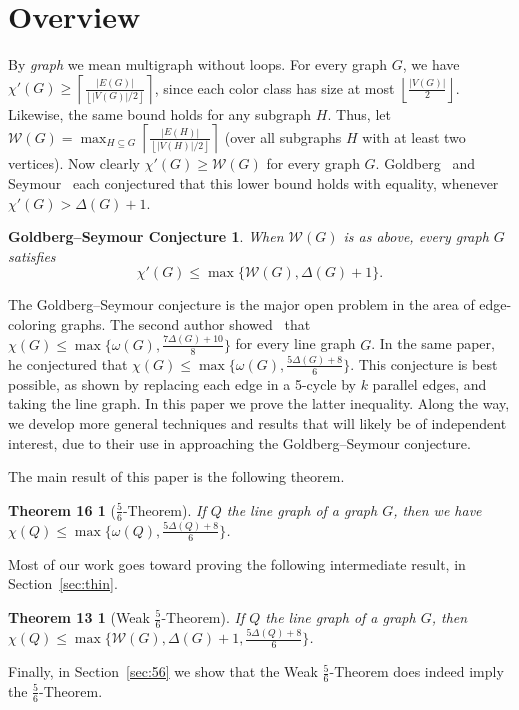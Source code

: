 \documentclass[12pt]{amsart}
\theoremstyle{plain}
\newtheorem*{GS}{Goldberg--Seymour Conjecture}
\newtheorem*{main}{Theorem 16}
\newtheorem*{main2}{Theorem 13}
\theoremstyle{definition}
\theoremstyle{remark}
\newcommand{\fancy}[1]{\mathcal{#1}}
\newcommand{\W}{\fancy{W}}
\newcommand{\ceil}[1]{\left\lceil#1\right\rceil}
\newcommand{\floor}[1]{\left\lfloor#1\right\rfloor}
\begin{document}
\section{Overview}

By \emph{graph} we mean multigraph without loops. For every graph $G$, we have $\chi'(G)\ge
\ceil{\frac{|E(G)|}{\floor{|V(G)|/2}}}$, since each color class has size at most
$\floor{\frac{|V(G)|}2}$.  Likewise, the same bound holds for any subgraph $H$.  
Thus, let $\W(G)=\max_{H\subseteq G}\ceil{\frac{|E(H)|}{\floor{|V(H)|/2}}}$
(over all subgraphs $H$ with at least two vertices). Now 
clearly $\chi'(G)\ge \W(G)$ for every graph $G$.  Goldberg~\cite{} and
Seymour~\cite{} each conjectured that this lower bound holds with equality,
whenever $\chi'(G)>\Delta(G)+1$.
\begin{GS}
When $\W(G)$ %
is as above, 
every graph $G$ satisfies
\[
\chi'(G)\le\max\{\W(G), \Delta(G)+1\}.
\]
\end{GS}
The Goldberg--Seymour conjecture is the major open problem in the area of
edge-coloring graphs.
The second author showed~\cite{rabern2011strengthening} that $\chi(G)\le
\max\{\omega(G), \frac{7\Delta(G)+10}{8}\}$  for every line graph $G$.
In the same paper, he conjectured
that $\chi(G)\le \max\{\omega(G),\frac{5\Delta(G)+8}{6}\}$. This conjecture is best
possible, as shown by replacing each edge in a 5-cycle by $k$ parallel edges,
and taking the line graph.
In this paper we prove the latter inequality.  Along the way, we develop
more general techniques and results that will likely be of independent
interest, due to their use in approaching the Goldberg--Seymour conjecture.

The main result of this paper is the following theorem.
\begin{main}[$\frac56$-Theorem]
If $Q$ the line graph of a graph $G$, then 
we have $\chi(Q)\le \max\{\omega(Q),\frac{5\Delta(Q)+8}{6}\}$. 
\end{main}

Most of our work goes toward proving the following
intermediate result, in Section~\ref{sec:thin}.
\begin{main2}[Weak $\frac56$-Theorem]
If $Q$ the line graph of a graph $G$, then 
$\chi(Q)\le \max\{\W(G),\Delta(G)+1,\frac{5\Delta(Q)+8}{6}\}$. 
\end{main2}
Finally, in Section~\ref{sec:56} we show that the Weak $\frac56$-Theorem does indeed imply
the $\frac56$-Theorem.
\end{document}
